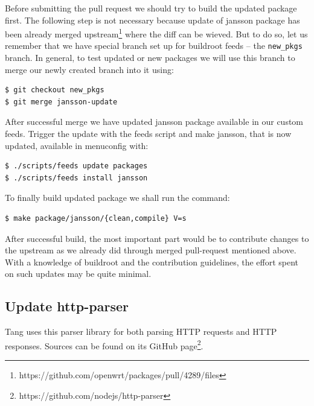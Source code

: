 Before submitting the pull request we should try to build the updated package first.
The following step is not necessary because update of jansson package has been already merged upstream\footnote{https://github.com/openwrt/packages/pull/4289/files} where the diff can be wieved.
But to do so, let us remember that we have special branch set up for buildroot feeds -- the {\tt new\_pkgs} branch.
In general, to test updated or new packages we will use this branch to merge our newly created branch into it using:
\begin{lstlisting}[columns=fixed,basicstyle=\ttfamily\footnotesize,tabsize=4,backgroundcolor=\color{yellow!10}]
$ git checkout new_pkgs
$ git merge jansson-update
\end{lstlisting}
After successful merge we have updated jansson package available in our custom feeds.
Trigger the update with the feeds script and make jansson, that is now updated, available in menuconfig with:
\begin{lstlisting}[columns=fixed,basicstyle=\ttfamily\footnotesize,tabsize=4,backgroundcolor=\color{yellow!10}]
$ ./scripts/feeds update packages
$ ./scripts/feeds install jansson
\end{lstlisting}
To finally build updated package we shall run the command:
\begin{lstlisting}[columns=fixed,basicstyle=\ttfamily\footnotesize,tabsize=4,backgroundcolor=\color{yellow!10}]
$ make package/jansson/{clean,compile} V=s
\end{lstlisting}

After successful build, the most important part would be to contribute changes to the upstream as we already did through merged pull-request mentioned above.
With a knowledge of buildroot and the contribution guidelines, the effort spent on such updates may be quite minimal.



\subsection{Update http-parser}\label{http-parser}
Tang uses this parser library for both parsing HTTP requests and HTTP responses.
Sources can be found on its GitHub page\footnote{https://github.com/nodejs/http-parser}.

